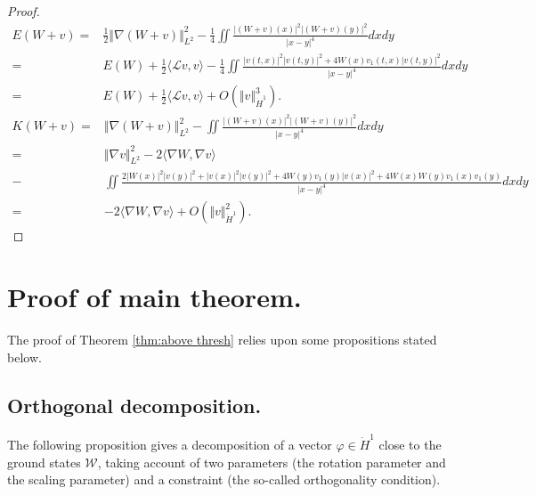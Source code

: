 \documentclass[reqno, 11pt]{amsart}
\numberwithin{equation}{section}
\theoremstyle{plain}
\theoremstyle{definition}
\numberwithin{equation}{section}
\numberwithin{theorem}{section}
\numberwithin{equation}{section}
\numberwithin{equation}{section}
\numberwithin{theorem}{section}
\begin{document}
	\begin{proof}
		\begin{equation*}
		\begin{aligned}
		E(W+v)=&\frac12 \Vert \nabla(W+v)\Vert_{L^2}^2-\frac{1}{4} \iint \frac{\big|(W+v)(x)\big|^2\big|(W+v)(y)\big|^2}{|x-y|^4} dxdy\\  =&E(W)+\frac{1}{2}\langle \mathcal{L}v,v\rangle-\frac{1}{4}\iint \frac{\big|v(t,x)\big|^2\big|v(t,y)\big|^2+4W(x)v_1(t,x)\big|v(t,y)\big|^2}{|x-y|^4} dxdy\\=&E(W)+\frac{1}{2}\langle \mathcal{L}v,v\rangle+O(\Vert v \Vert_{\dot H^1}^3).
		\end{aligned}
		\end{equation*}	
		\begin{equation*}
		\begin{aligned}
		K(W+v)=&\Vert \nabla(W+v)\Vert_{L^2}^2-\iint \frac{\big|(W+v)(x)\big|^2\big|(W+v)(y)\big|^2}{|x-y|^4} dxdy\\  =&\Vert \nabla v\Vert_{L^2}^2 - 2\langle \nabla W,\nabla v\rangle\\-& \iint \frac{2|W(x)|^2|v(y)|^2+|v(x)|^2|v(y)|^2+4W(y)v_1(y)|v(x)|^2+4W(x)W(y)v_1(x)v_1(y)}{|x-y|^4} dxdy\\=&- 2\langle \nabla W,\nabla v\rangle+O(\Vert v \Vert_{\dot H^1}^2).
		\end{aligned}
		\end{equation*}	
	\end{proof}
	
	
	
	
	
	\section{Proof of main theorem.}\label{sect:main thm}
	The proof of Theorem \ref{thm:above thresh} relies upon some propositions stated below. 
	\subsection{Orthogonal decomposition.}
	The following proposition gives a decomposition of a vector $\varphi\in \dot H^1$ close to the ground states $\mathcal{W}$, taking account of two parameters (the rotation parameter and the scaling parameter) and a constraint (the so-called orthogonality condition).
	
\end{document}
